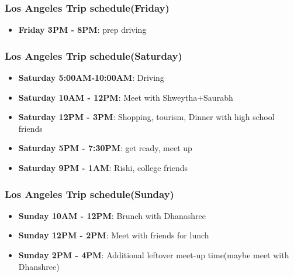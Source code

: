 \begin{frame} 
\frametitle{Los Angeles Trip schedule(Friday)}
\begin{itemize} 
\item \textbf{Friday 3PM - 8PM}: prep driving 
\end{itemize} 
\end{frame}

\begin{frame} 
\frametitle{Los Angeles Trip schedule(Saturday)}
\begin{itemize} 
\item \textbf{Saturday 5:00AM-10:00AM}: Driving
\item \textbf{Saturday 10AM - 12PM}: Meet with Shweytha+Saurabh  
\item \textbf{Saturday 12PM - 3PM}: Shopping, tourism, Dinner with high school friends  
\item \textbf{Saturday 5PM - 7:30PM}: get ready, meet up
\item \textbf{Saturday 9PM - 1AM}: Rishi, college friends 
\end{itemize} 
\end{frame}

\begin{frame} 
\frametitle{Los Angeles Trip schedule(Sunday)}
\begin{itemize} 
\item \textbf{Sunday 10AM - 12PM}: Brunch with Dhanashree 
\item \textbf{Sunday 12PM - 2PM}: Meet with friends for lunch
\item \textbf{Sunday 2PM - 4PM}: Additional leftover meet-up time(maybe meet with Dhanshree)
\end{itemize} 
\end{frame}
